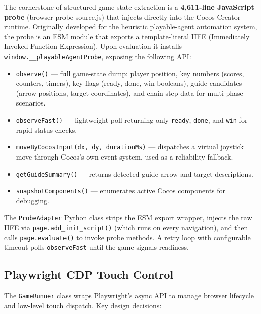 \documentclass[11pt,a4paper]{article}
\begin{document}
The cornerstone of structured game-state extraction is a \textbf{4,611-line JavaScript probe} (browser-probe-source.js) that injects directly into the Cocos Creator runtime. Originally developed for the heuristic playable-agent automation system, the probe is an ESM module that exports a template-literal IIFE (Immediately Invoked Function Expression). Upon evaluation it installs \texttt{window.\_\_playableAgentProbe}, exposing the following API:

\begin{itemize}[leftmargin=*,itemsep=2pt]
  \item \texttt{observe()} — full game-state dump: player position, key numbers (scores, counters, timers), key flags (ready, done, win booleans), guide candidates (arrow positions, target coordinates), and chain-step data for multi-phase scenarios.
  \item \texttt{observeFast()} — lightweight poll returning only \texttt{ready}, \texttt{done}, and \texttt{win} for rapid status checks.
  \item \texttt{moveByCocosInput(dx, dy, durationMs)} — dispatches a virtual joystick move through Cocos's own event system, used as a reliability fallback.
  \item \texttt{getGuideSummary()} — returns detected guide-arrow and target descriptions.
  \item \texttt{snapshotComponents()} — enumerates active Cocos components for debugging.
\end{itemize}

The \texttt{ProbeAdapter} Python class strips the ESM export wrapper, injects the raw IIFE via \texttt{page.add\_init\_script()} (which runs on every navigation), and then calls \texttt{page.evaluate()} to invoke probe methods. A retry loop with configurable timeout polls \texttt{observeFast} until the game signals readiness.

\subsection{Playwright CDP Touch Control}

The \texttt{GameRunner} class wraps Playwright's async API to manage browser lifecycle and low-level touch dispatch. Key design decisions:
\end{document}
